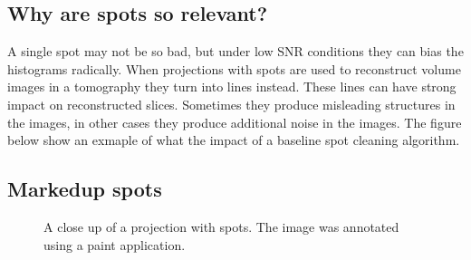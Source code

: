 \documentclass[letterpaper,10pt,english]{sphinxmanual}
\begin{document}
\begin{sphinxVerbatim}[commandchars=\\\{\}]
 
 \PYG{p}{[}\PYG{p}{]}
  
\PYG{p}{[}\PYG{p}{]}\PYG{p}{[}\PYG{p}{]}
\end{sphinxVerbatim}

\noindent{}


\subsection{Why are spots so relevant?}
\label{\detokenize{ML4NeutronImageSegmentation:why-are-spots-so-relevant}}
A single spot may not be so bad, but under low SNR conditions they can bias the histograms radically. When projections with spots are used to reconstruct volume images in a tomography they turn into lines instead. These lines can have strong impact on reconstructed slices. Sometimes they produce misleading structures in the images, in other cases they produce additional noise in the images. The figure below show an exmaple of what the impact of a baseline spot cleaning algorithm.



\subsection{Marked\sphinxhyphen{}up spots}
\label{\detokenize{ML4NeutronImageSegmentation:marked-up-spots}}
\begin{figure}[htbp]
\centering
\capstart

\noindent{}
\caption{A close up of a projection with spots. The image was annotated using a paint application.}\label{\detokenize{ML4NeutronImageSegmentation:id18}}\end{figure}
\end{document}
